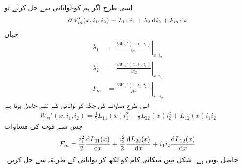 اسی طرح اگر ہم کو-توانائی سے حل کرتے تو
\begin{align}
\partial W_m'(x,i_1,i_2)=\lambda_1 \dif i_1+\lambda_2 \dif i_2+F_m \dif x
\end{align}
جہاں
\begin{align}
\lambda_1&=\left. \frac{\partial W_m'(x,i_1,i_2)}{\partial i_1} \right|_{x,i_2}\\
\lambda_2&=\left. \frac{\partial W_m'(x,i_1,i_2)}{\partial i_2} \right|_{x,i_1}\\
F_m&=\left. \frac{\partial W_m'(x,i_1,i_2)}{\partial x} \right|_{i_1,i_2}
\end{align}
اسی طرح مساوات   کی جگہ کو-توانائی کے لئے حاصل ہوتا ہے
\begin{align}
W_m'(x,i_1,i_2)=\frac{1}{2}L_{11}(x) i_1^2+\frac{1}{2} L_{22}(x) i_2^2+L_{12}(x)i_1 i_2
\end{align}
جس سے قوت کی مساوات
\begin{align}
F_m=\frac{i_1^2}{2} \frac{\dif L_{11}(x)}{\dif x}+\frac{i_2^2}{2}\frac{\dif L_{22}(x)}{\dif x}+i_1 i_2 \frac{\dif L_{12}(x)}{\dif x}
\end{align}
حاصل ہوتی ہے۔
%
شکل   میں میکانی کام کو   لکھ کر توانائی کے طریقہ سے حل کریں۔

